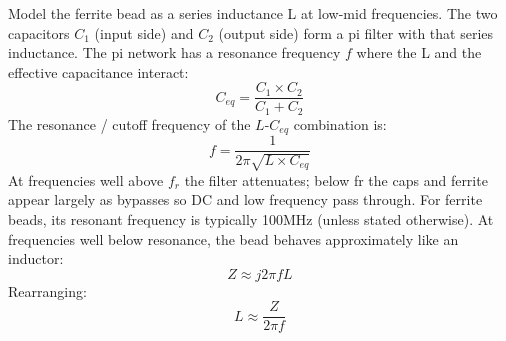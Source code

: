 Model the ferrite bead as a series inductance L at low-mid frequencies. The two capacitors $C_1$ (input side) and $C_2$ (output side) form a pi filter with that series inductance. The pi network has a resonance frequency $f$ where the L and the effective capacitance interact:
\begin{equation}
    C_{eq} = \frac{C_1 \times C_2}{C_1 + C_2}
\end{equation}
The resonance / cutoff frequency of the $L$-$C_{eq}$ combination is:
\begin{equation}
    f = \frac{1}{2\pi \sqrt{L \times C_{eq}}}
\end{equation}
At frequencies well above $f_r$ the filter attenuates; below fr the caps and ferrite appear largely as bypasses so DC and low frequency pass through.
\nl
For ferrite beads, its resonant frequency is typically 100MHz (unless stated otherwise). At frequencies well below resonance, the bead behaves approximately like an inductor:
\begin{equation}
    Z \approx j2\pi f L
\end{equation}
Rearranging:
\begin{equation}
    L \approx \frac{Z}{2\pi f}
\end{equation}